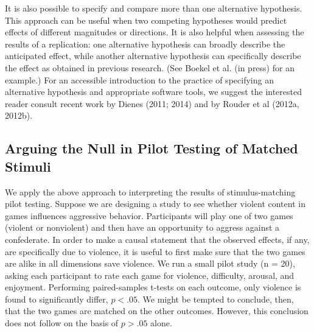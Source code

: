 \documentclass[fignum,nobf,man]{apa}
\begin{document}
It is also possible to specify and compare more than one alternative hypothesis. This approach can be useful when two competing hypotheses would predict effects of different magnitudes or directions. It is also helpful when assessing the results of a replication: one alternative hypothesis can broadly describe the anticipated effect, while another alternative hypothesis can specifically describe the effect as obtained in previous research. (See Boekel et al. (in press) for an example.)  For an accessible introduction to the practice of specifying an alternative hypothesis and appropriate software tools, we suggest the interested reader consult recent work by Dienes (2011; 2014) and by Rouder et al (2012a, 2012b).

\subsection{Arguing the Null in Pilot Testing of Matched Stimuli}
We apply the above approach to interpreting the results of stimulus-matching pilot testing.  Suppose we are designing a study to see whether violent content in games influences aggressive behavior. Participants will play one of two games (violent or nonviolent) and then have an opportunity to aggress against a confederate. In order to make a causal statement that the observed effects, if any, are specifically due to violence, it is useful to first make sure that the two games are alike in all dimensions save violence. We run a small pilot study (n = 20), asking each participant to rate each game for violence, difficulty, arousal, and enjoyment. Performing paired-samples t-tests on each outcome, only violence is found to significantly differ, $p < .05$. We might be tempted to conclude, then, that the two games are matched on the other outcomes. However, this conclusion does not follow on the basis of $p > .05$ alone.
\end{document}
